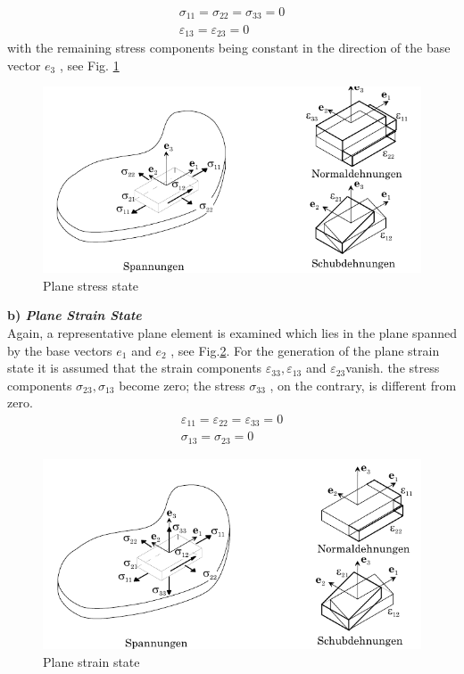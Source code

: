 \begin{equation}
\begin{gathered}
  \sigma_{11}=\sigma_{22}=\sigma_{33}=0 \\
    \varepsilon_{13}=\varepsilon_{23}=0
\end{gathered}
\end{equation}
with the remaining stress components being constant in the direction of the base vector $e_3$ , see Fig. \ref{fig:111}
\begin{figure}[H]
    \centering
    \includegraphics[scale=0.5]{Figures/Chapter2/111.png}
    \decoRule   
    \caption{Plane stress state}
    \label{fig:111}
\end{figure}
\vspace{0.38cm} \textbf{b) \textit{Plane Strain State}} \\
Again, a representative plane element is examined which lies in the plane spanned by the base
vectors $e_1$ and $e_2$ , see Fig.\ref{fig:112}. For the generation of the plane strain state it is assumed that the strain components $ \varepsilon_{33} , \varepsilon_{13}$ and $\varepsilon_{23} $vanish. the stress components $\sigma_{23} , \sigma_{13}$ become zero; the stress $\sigma_{33}$ , on the contrary, is different from zero.
\begin{equation}
\begin{gathered}
  \varepsilon_{11}=\varepsilon_{22}=\varepsilon_{33}=0 \\
    \sigma_{13}=\sigma_{23}=0
\end{gathered}
\end{equation}
\begin{figure}[H]
    \centering
    \includegraphics[scale=0.5]{Figures/Chapter2/112.png}
    \decoRule   
    \caption{  Plane strain state}
    \label{fig:112}
\end{figure}

